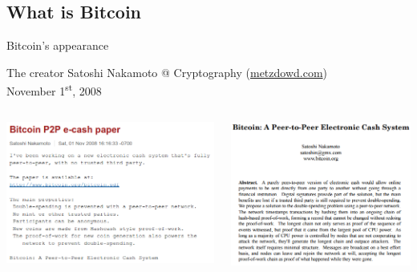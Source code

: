 \documentclass{beamer}
\begin{document}
\subsection{What is Bitcoin}
\begin{frame}{Bitcoin's appearance}
 \begin{block}{The creator}
  Satoshi Nakamoto @ Cryptography (\url{metzdowd.com})\\
  November 1\textsuperscript{st}, 2008
 \end{block}
 \begin{columns}
  \begin{column}{0.5\textwidth}
   \begin{center}
    \includegraphics[width=\textwidth, height=0.8\textheight, keepaspectratio]{img/metzdowd_post.png}
   \end{center}
  \end{column}
  \begin{column}{0.5\textwidth}
   \begin{center}
    \includegraphics[width=\textwidth, height=0.8\textheight, keepaspectratio]{img/bitcoin_paper.png}
   \end{center}
  \end{column}
 \end{columns}
\end{frame}
\end{document}
